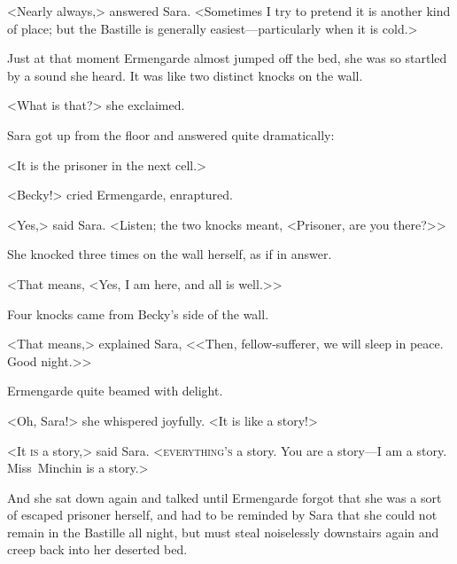 <Nearly always,> answered Sara. <Sometimes I try to pretend it is another kind of place; but the Bastille is generally easiest—particularly when it is cold.>

Just at that moment Ermengarde almost jumped off the bed, she was so startled by a sound she heard. It was like two distinct knocks on the wall.

<What is that?> she exclaimed.

Sara got up from the floor and answered quite dramatically:

<It is the prisoner in the next cell.>

<Becky!> cried Ermengarde, enraptured.

<Yes,> said Sara. <Listen; the two knocks meant, <Prisoner, are you there?>>

She knocked three times on the wall herself, as if in answer.

<That means, <Yes, I am here, and all is well.>>

Four knocks came from Becky's side of the wall.

<That means,> explained Sara, <<Then, fellow-sufferer, we will sleep in peace. Good night.>>

Ermengarde quite beamed with delight.

<Oh, Sara!> she whispered joyfully. <It is like a story!>

<It \textsc{is} a story,> said Sara. <\textsc{everything's} a story. You are a story—I am a story. Miss~Minchin is a story.>

And she sat down again and talked until Ermengarde forgot that she was a sort of escaped prisoner herself, and had to be reminded by Sara that she could not remain in the Bastille all night, but must steal noiselessly downstairs again and creep back into her deserted bed.